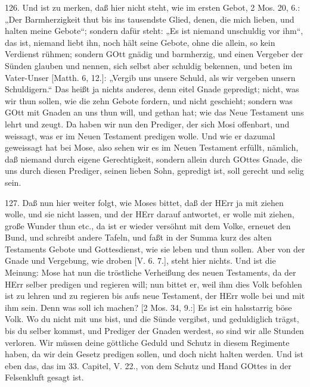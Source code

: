 126. Und ist zu merken, daß hier nicht steht, wie im ersten Gebot, 2 Mos. 20, 6.: „Der Barmherzigkeit thut bis ins tausendste Glied, denen,
die mich lieben, und halten meine Gebote“; sondern dafür steht: „Es ist niemand unschuldig vor ihm“, das ist, niemand liebt ihn, noch hält seine Gebote, ohne die allein, so kein Verdienst rühmen; sondern GOtt gnädig und barmherzig, und einen Vergeber der Sünden glauben und nennen, sich selbst aber schuldig bekennen, und beten im Vater-Unser [Matth. 6, 12.]: „Vergib uns unsere Schuld, als wir vergeben unsern Schuldigern.“ Das heißt ja nichts anderes, denn eitel Gnade gepredigt; nicht, was wir thun sollen, wie die zehn Gebote fordern, und nicht geschieht; sondern was GOtt mit Gnaden an uns thun will, und gethan hat; wie das Neue Testament uns lehrt und zeugt. Da haben wir nun den Prediger, der sich Mosi offenbart, und weissagt, was er im Neuen Testament predigen wolle. Und wie er dazumal geweissagt hat bei Mose, also sehen wir es im Neuen Testament erfüllt, nämlich, daß niemand durch eigene Gerechtigkeit, sondern allein durch GOttes Gnade, die uns durch diesen Prediger, seinen lieben Sohn, gepredigt ist, soll gerecht und selig sein.

127. Daß nun hier weiter folgt, wie Moses bittet, daß der HErr ja mit ziehen wolle, und sie nicht lassen, und der HErr darauf antwortet, er wolle mit ziehen, große Wunder thun etc., da ist er wieder versöhnt mit dem Volke, erneuet den Bund, und schreibt andere Tafeln, und faßt in der Summa kurz des alten Testaments Gebote und Gottesdienst, wie sie leben und thun sollen. Aber von der Gnade und Vergebung, wie droben [V. 6. 7.], steht hier nichts. Und ist die Meinung: Mose hat nun die tröstliche Verheißung des neuen Testaments, da der HErr selber predigen und regieren will; nun bittet er, weil ihm dies Volk befohlen ist zu lehren und zu regieren bis aufs neue Testament, der HErr wolle bei und mit ihm sein. Denn was soll ich machen? [2 Mos. 34, 9.:] Es ist ein halsstarrig böse Volk. Wo du nicht mit uns bist, und die Sünde vergibst, und geduldiglich trägst, bis du selber kommst, und Prediger der Gnaden werdest, so sind wir alle Stunden verloren. Wir müssen deine göttliche Geduld und Schutz in diesem Regimente haben, da wir dein Gesetz predigen sollen, und doch nicht halten werden. Und ist eben das, das im 33. Capitel, V. 22., von dem Schutz und Hand GOttes in der Felsenkluft gesagt ist.

